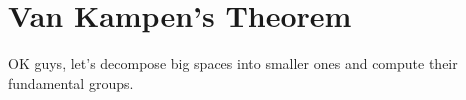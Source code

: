\section{Van Kampen's Theorem}
OK guys, let's decompose big spaces into smaller ones and compute their fundamental groups.
